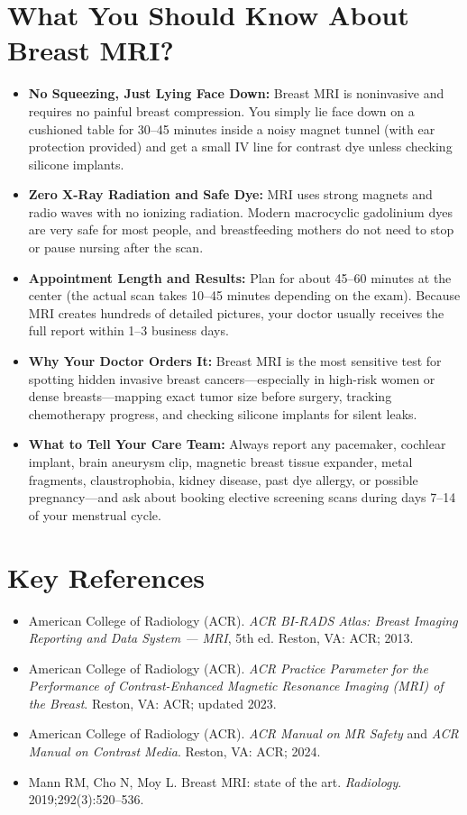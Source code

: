 \section{What You Should Know About Breast MRI?}
\begin{itemize}
\item \textbf{No Squeezing, Just Lying Face Down:} Breast MRI is noninvasive and requires no painful breast compression. You simply lie face down on a cushioned table for 30--45 minutes inside a noisy magnet tunnel (with ear protection provided) and get a small IV line for contrast dye unless checking silicone implants.
\item \textbf{Zero X-Ray Radiation and Safe Dye:} MRI uses strong magnets and radio waves with no ionizing radiation. Modern macrocyclic gadolinium dyes are very safe for most people, and breastfeeding mothers do not need to stop or pause nursing after the scan.
\item \textbf{Appointment Length and Results:} Plan for about 45--60 minutes at the center (the actual scan takes 10--45 minutes depending on the exam). Because MRI creates hundreds of detailed pictures, your doctor usually receives the full report within 1--3 business days.
\item \textbf{Why Your Doctor Orders It:} Breast MRI is the most sensitive test for spotting hidden invasive breast cancers---especially in high-risk women or dense breasts---mapping exact tumor size before surgery, tracking chemotherapy progress, and checking silicone implants for silent leaks.
\item \textbf{What to Tell Your Care Team:} Always report any pacemaker, cochlear implant, brain aneurysm clip, magnetic breast tissue expander, metal fragments, claustrophobia, kidney disease, past dye allergy, or possible pregnancy---and ask about booking elective screening scans during days 7--14 of your menstrual cycle.
\end{itemize}

\section{Key References}
\begin{itemize}
\item American College of Radiology (ACR). \textit{ACR BI-RADS Atlas: Breast Imaging Reporting and Data System --- MRI}, 5th ed. Reston, VA: ACR; 2013.
\item American College of Radiology (ACR). \textit{ACR Practice Parameter for the Performance of Contrast-Enhanced Magnetic Resonance Imaging (MRI) of the Breast}. Reston, VA: ACR; updated 2023.
\item American College of Radiology (ACR). \textit{ACR Manual on MR Safety} and \textit{ACR Manual on Contrast Media}. Reston, VA: ACR; 2024.
\item Mann RM, Cho N, Moy L. Breast MRI: state of the art. \textit{Radiology}. 2019;292(3):520--536.
\end{itemize}

